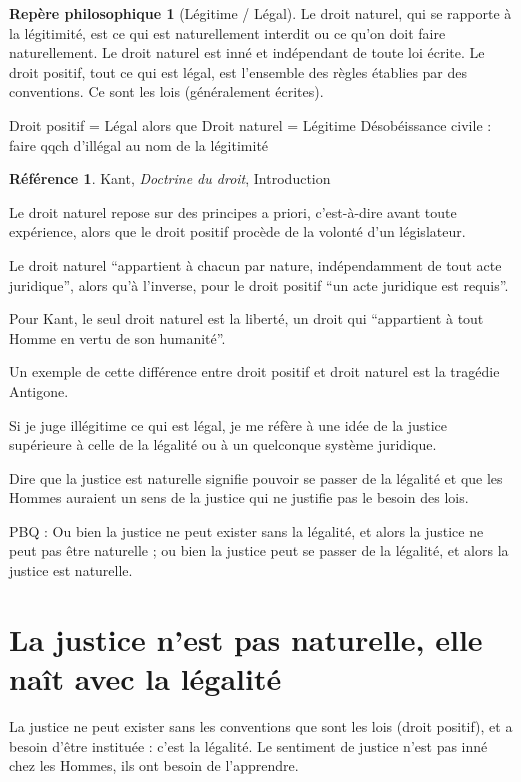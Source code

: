 \documentclass[french]{book}
\theoremstyle{definition}
\newtheorem*{refe}{Référence}
\newtheorem*{rep}{Repère philosophique}
\begin{document}
\begin{rep}[Légitime / Légal]
Le droit naturel, qui se rapporte à la légitimité, est ce qui est naturellement interdit ou ce qu’on doit faire naturellement. Le droit naturel est inné et indépendant de toute loi écrite.
Le droit positif, tout ce qui est légal, est l’ensemble des règles établies par des conventions. Ce sont les lois (généralement écrites).
\end{rep}


Droit positif = Légal    alors que    Droit naturel = Légitime
Désobéissance civile : faire qqch d’illégal au nom de la légitimité

\begin{refe}
	Kant, \textit{Doctrine du droit}, Introduction
\end{refe}

Le droit naturel repose sur des principes a priori, c’est-à-dire avant toute expérience, alors que le droit positif procède de la volonté d’un législateur.

Le droit naturel “appartient à chacun par nature, indépendamment de tout acte juridique”, alors qu’à l'inverse, pour le droit positif “un acte juridique est requis”.

Pour Kant, le seul droit naturel est la liberté, un droit qui “appartient à tout Homme en vertu de son humanité”.

Un exemple de cette différence entre droit positif et droit naturel est la tragédie Antigone.

Si je juge illégitime ce qui est légal, je me réfère à une idée de la justice supérieure à celle de la légalité ou à un quelconque système juridique.

Dire que la justice est naturelle signifie pouvoir se passer de la légalité et que les Hommes auraient un sens de la justice qui ne justifie pas le besoin des lois.

PBQ :
Ou bien la justice ne peut exister sans la légalité, et alors la justice ne peut pas être naturelle ; ou bien la justice peut se passer de la légalité, et alors la justice est naturelle.

\section{La justice n’est pas naturelle, elle naît avec la légalité}

La justice ne peut exister sans les conventions que sont les lois (droit positif), et a besoin d’être instituée : c’est la légalité.
Le sentiment de justice n’est pas inné chez les Hommes, ils ont besoin de l’apprendre.
\end{document}
